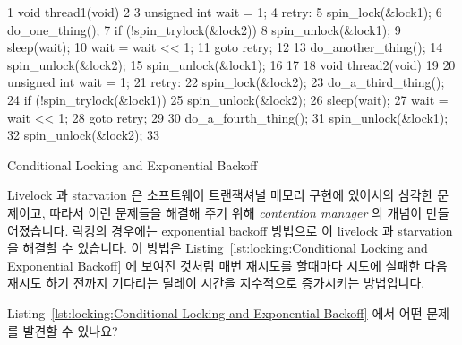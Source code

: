\begin{listing}[tbp]
{ \scriptsize
\begin{verbbox}
  1 void thread1(void)
  2 {
  3   unsigned int wait = 1;
  4 retry:
  5   spin_lock(&lock1);
  6   do_one_thing();
  7   if (!spin_trylock(&lock2)) {
  8     spin_unlock(&lock1);
  9     sleep(wait);
 10     wait = wait << 1;
 11     goto retry;
 12   }
 13   do_another_thing();
 14   spin_unlock(&lock2);
 15   spin_unlock(&lock1);
 16 }
 17 
 18 void thread2(void)
 19 {
 20   unsigned int wait = 1;
 21 retry:
 22   spin_lock(&lock2);
 23   do_a_third_thing();
 24   if (!spin_trylock(&lock1)) {
 25     spin_unlock(&lock2);
 26     sleep(wait);
 27     wait = wait << 1;
 28     goto retry;
 29   }
 30   do_a_fourth_thing();
 31   spin_unlock(&lock1);
 32   spin_unlock(&lock2);
 33 }
\end{verbbox}
}
\centering
\theverbbox
\caption{Conditional Locking and Exponential Backoff}
\label{lst:locking:Conditional Locking and Exponential Backoff}
\end{listing}

Livelock 과 starvation 은 소프트웨어 트랜잭셔널 메모리 구현에 있어서의 심각한
문제이고, 따라서 이런 문제들을 해결해 주기 위해 \emph{contention manager} 의
개념이 만들어졌습니다.
락킹의 경우에는 exponential backoff 방법으로 이 livelock 과 starvation 을
해결할 수 있습니다.
이 방법은 Listing~\ref{lst:locking:Conditional Locking and Exponential Backoff}
에 보여진 것처럼 매번 재시도를 할때마다 시도에 실패한 다음 재시도 하기 전까지
기다리는 딜레이 시간을 지수적으로 증가시키는 방법입니다.

\QuickQuiz{}
	Listing~\ref{lst:locking:Conditional Locking and Exponential Backoff}
	에서 어떤 문제를 발견할 수 있나요?
	\iffalse

